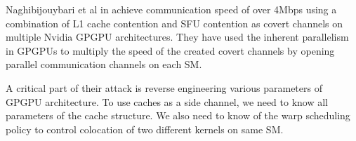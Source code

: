 Naghibijouybari et al in  achieve communication speed of
over 4Mbps using a combination of L1 cache contention and SFU contention as
covert channels on multiple Nvidia GPGPU architectures. They have used the
inherent parallelism in GPGPUs to multiply the speed of the created covert
channels by opening parallel communication channels on each SM.

A critical part of their attack is reverse engineering various parameters of
GPGPU architecture. To use caches as a side channel, we need to know all
parameters of the cache structure. We also need to know of the warp scheduling
policy to control colocation of two different kernels on same SM.


